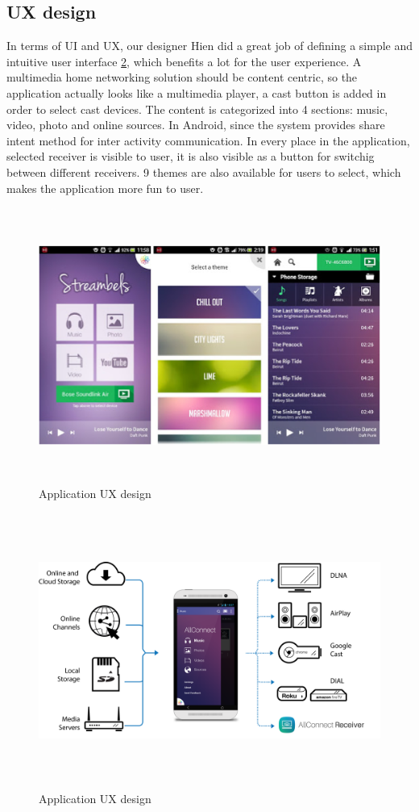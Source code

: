 \subsection{UX design}
In terms of UI and UX, our designer Hien did a great job of defining a simple
and intuitive user interface \ref{chart5}, which benefits a lot for the user
experience.
A multimedia home networking solution should be content centric, so the
application actually looks like a multimedia player, a cast button is added in
order to select cast devices. The content is categorized into 4 sections: music,
video, photo and online sources. In Android, since the system provides share
intent method for inter activity communication. In every place in the
application, selected receiver is visible to user, it is also visible as a
button for switchig between different receivers. 9 themes are also available
for users to select, which makes the application more fun to user.
\begin{figure}[htb]
\centering \includegraphics[height=9cm]{charts/streambels_ui}
\caption{Application UX design \label{chart5}}
\end{figure}

\begin{figure}[htb]
\centering \includegraphics[height=9cm]{charts/allconnect-app}
\caption{Application UX design \label{chart5}}
\end{figure}

